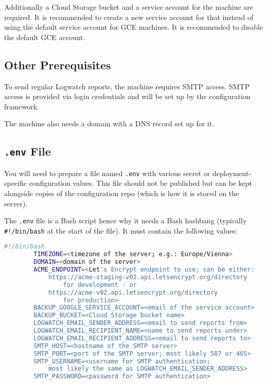 \documentclass[12pt,a4paper]{report}
\begin{document}
	Additionally a Cloud Storage bucket and a service account for the machine are required. It is recommended to create a new service account for that instead of using the default service account for GCE machines. It is recommended to disable the default GCE account.
	
	\subsection{Other Prerequisites}
	To send regular Logwatch reports, the machine requires SMTP access. SMTP access is provided via login credentials and will be set up by the configuration framework.
	
	The machine also needs a domain with a DNS record set up for it.
	
	\subsection{\lstinline|.env| File}
	You will need to prepare a file named \lstinline|.env| with various secret or deployment-specific configuration values. This file should not be published but can be kept alongside copies of the configuration repo (which is how it is stored on the server).
	
	The \lstinline|.env| file is a Bash script hence why it needs a Bash hashbang (typically \lstinline|#!/bin/bash| at the start of the file). It must contain the following values:
	
	\begin{lstlisting}[language=bash]
		#!/bin/bash
		TIMEZONE=<timezone of the server; e.g.: Europe/Vienna>
		DOMAIN=<domain of the server>
		ACME_ENDPOINT=<Let's Encrypt endpoint to use; can be either:
		    https://acme-staging-v02.api.letsencrypt.org/directory
		        for development - or
		    https://acme-v02.api.letsencrypt.org/directory
		        for production>
		BACKUP_GOOGLE_SERVICE_ACCOUNT=<email of the service account>
		BACKUP_BUCKET=<Cloud Storage bucket name>
		LOGWATCH_EMAIL_SENDER_ADDRESS=<email to send reports from>
		LOGWATCH_EMAIL_RECIPIENT_NAME=<name to send reports under>
		LOGWATCH_EMAIL_RECIPIENT_ADDRESS=<email to send reports to>
		SMTP_HOST=<hostname of the SMTP server>
		SMTP_PORT=<port of the SMTP server; most likely 587 or 465>
		SMTP_USERNAME=<username for SMTP authentication;
		    most likely the same as LOGWATCH_EMAIL_SENDER_ADDRESS>
		SMTP_PASSWORD=<password for SMTP authentication>
	\end{lstlisting}
\end{document}
